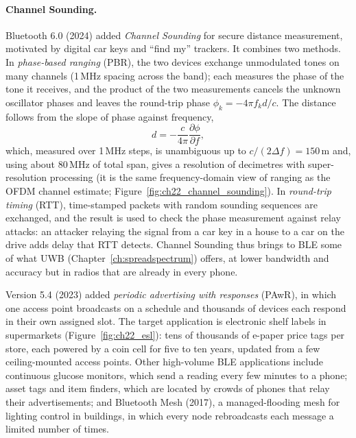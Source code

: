 \paragraph{Channel Sounding.} Bluetooth 6.0 (2024) added \emph{Channel Sounding} for secure distance
measurement, motivated by digital car keys and ``find my'' trackers. It combines two methods. In
\emph{phase-based ranging} (PBR), the two devices exchange unmodulated tones on many channels (1\,MHz
spacing across the band); each measures the phase of the tone it receives, and the product of the two
measurements cancels the unknown oscillator phases and leaves the round-trip phase
$\phi_k=-4\pi f_kd/c$. The distance follows from the slope of phase against frequency,
\begin{equation}
d=-\frac{c}{4\pi}\frac{\partial\phi}{\partial f},
\label{eq:ch22:pbr}
\end{equation}
which, measured over 1\,MHz steps, is unambiguous up to $c/(2\Delta f)=150$\,m and, using about
80\,MHz of total span, gives a resolution of decimetres with super-resolution processing (it is the
same frequency-domain view of ranging as the OFDM channel estimate; Figure~\ref{fig:ch22_channel_sounding}).
In \emph{round-trip timing} (RTT), time-stamped packets with random sounding sequences are exchanged,
and the result is used to check the phase measurement against relay attacks: an attacker relaying the
signal from a car key in a house to a car on the drive adds delay that RTT detects. Channel Sounding
thus brings to BLE some of what UWB (Chapter~\ref{ch:spreadspectrum}) offers, at lower bandwidth and
accuracy but in radios that are already in every phone.


\begin{inpractice}
Version 5.4 (2023) added \emph{periodic advertising with responses} (PAwR), in which one access point
broadcasts on a schedule and thousands of devices each respond in their own assigned slot. The
target application is electronic shelf labels in supermarkets (Figure~\ref{fig:ch22_esl}): tens of
thousands of e-paper price tags per store, each powered by a coin cell for five to ten years, updated
from a few ceiling-mounted access points. Other high-volume BLE applications include continuous
glucose monitors, which send a reading every few minutes to a phone; asset tags and item finders,
which are located by crowds of phones that relay their advertisements; and Bluetooth Mesh (2017), a
managed-flooding mesh for lighting control in buildings, in which every node rebroadcasts each
message a limited number of times.
\end{inpractice}

